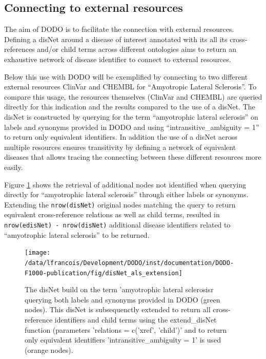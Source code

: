 \documentclass[9pt,a4paper,]{extarticle}
\begin{document}
\hypertarget{connecting-to-external-resources}{%
\subsection{Connecting to external resources}\label{connecting-to-external-resources}}

The aim of DODO is to facilitate the connection with external resources. Defining a disNet around a disease of interest annotated with its all its cross-references and/or child terms across different ontologies aims to return an exhaustive network of disease identifier to connect to external resources.

Below this use with DODO will be exemplified by connecting to two different external resources ClinVar and CHEMBL for ``Amyotropic Lateral Sclerosis''. To compare this usage, the resources themselves (ClinVar and CHEMBL) are queried directly for this indication and the results compared to the use of a disNet. The disNet is constructed by querying for the term ``amyotrophic lateral sclerosis'' on labels and synonyms provided in DODO and using ``intransitive\_ambiguity = 1'' to return only equivalent identifiers. In addition the use of a disNet across multiple resources ensures transitivity by defining a network of equivalent diseases that allows tracing the connecting between these different resources more easily.

Figure \ref{fig:disNetalsExtension} shows the retrieval of additional nodes not identified when querying directly for ``amyotrophic lateral sclerosis'' through either labels or synonyms. Extending the \texttt{nrow(disNet)} original nodes matching the query to return equivalent cross-reference relations as well as child terms, resulted in \texttt{nrow(edisNet)\ -\ nrow(disNet)} additional disease identifiers related to ``amyotrophic lateral sclerosis'' to be returned.

\begin{figure}

{\centering \texttt{[image: /data/lfrancois/Development/DODO/inst/documentation/DODO-F1000-publication/fig/disNet\_als\_extension]} 

}

\caption{The disNet build on the term 'amyotrophic lateral sclerosisr querying both labels and synonyms provided in DODO (green nodes). This disNet is subsequenctly extended to return all cross-reference identifiers and child terms using the extend\_disNet function (parameters 'relations = c('xref', 'child')' and to return only equivalent identifiers 'intransitive\_ambiguity = 1' is used (orange nodes).}\label{fig:disNetalsExtension}
\end{figure}
\end{document}
